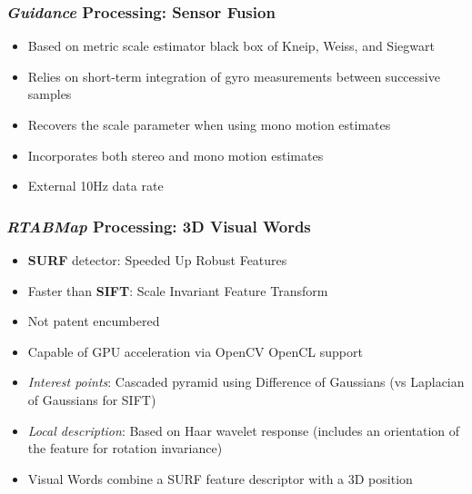 \documentclass{beamer}
\begin{document}
\begin{frame}
\frametitle{\textit{Guidance} Processing: Sensor Fusion}
\begin{itemize}
\item{Based on metric scale estimator black box of Kneip, Weiss, and Siegwart}
\item{Relies on short-term integration of gyro measurements between successive samples}
\item{Recovers the scale parameter when using mono motion estimates}
\item{Incorporates both stereo and mono motion estimates}
\item{External 10Hz data rate}
\end{itemize}
\end{frame}

\begin{frame}
\frametitle{\textit{RTABMap} Processing: 3D Visual Words}
\begin{itemize}
\item{\textbf{SURF} detector: Speeded Up Robust Features}
\item{Faster than \textbf{SIFT}: Scale Invariant Feature Transform}
\item{Not patent encumbered}
\item{Capable of GPU acceleration via OpenCV OpenCL support} 
\item{\textit{Interest points}: Cascaded pyramid using Difference of Gaussians (vs Laplacian of Gaussians for SIFT)}
\item{\textit{Local description}: Based on Haar wavelet response (includes an orientation of the feature for rotation invariance)}
\item{Visual Words combine a SURF feature descriptor with a 3D position}
\end{itemize}
\end{frame}
\end{document}
